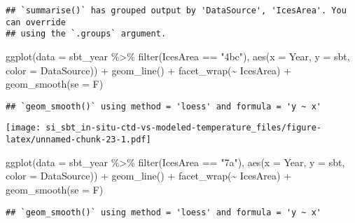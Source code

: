 \documentclass[
]{article}
\newenvironment{Shaded}{\begin{snugshade}}{\end{snugshade}}
\newcommand{\AttributeTok}[1]{\textcolor[rgb]{0.77,0.63,0.00}{#1}}
\newcommand{\FunctionTok}[1]{\textcolor[rgb]{0.00,0.00,0.00}{#1}}
\newcommand{\NormalTok}[1]{#1}
\newcommand{\SpecialCharTok}[1]{\textcolor[rgb]{0.00,0.00,0.00}{#1}}
\newcommand{\StringTok}[1]{\textcolor[rgb]{0.31,0.60,0.02}{#1}}
\begin{document}
\begin{verbatim}
## `summarise()` has grouped output by 'DataSource', 'IcesArea'. You can override
## using the `.groups` argument.
\end{verbatim}

\begin{Shaded}
\begin{Highlighting}[]
\FunctionTok{ggplot}\NormalTok{(}\AttributeTok{data =}\NormalTok{ sbt\_year }\SpecialCharTok{\%\textgreater{}\%} \FunctionTok{filter}\NormalTok{(IcesArea }\SpecialCharTok{==} \StringTok{"4bc"}\NormalTok{), }\FunctionTok{aes}\NormalTok{(}\AttributeTok{x =}\NormalTok{ Year, }\AttributeTok{y =}\NormalTok{ sbt, }\AttributeTok{color =}\NormalTok{ DataSource)) }\SpecialCharTok{+} \FunctionTok{geom\_line}\NormalTok{() }\SpecialCharTok{+} \FunctionTok{facet\_wrap}\NormalTok{(}\SpecialCharTok{\textasciitilde{}}\NormalTok{ IcesArea) }\SpecialCharTok{+} \FunctionTok{geom\_smooth}\NormalTok{(}\AttributeTok{se =}\NormalTok{ F)}
\end{Highlighting}
\end{Shaded}

\begin{verbatim}
## `geom_smooth()` using method = 'loess' and formula = 'y ~ x'
\end{verbatim}

\texttt{[image: si\_sbt\_in-situ-ctd-vs-modeled-temperature\_files/figure-latex/unnamed-chunk-23-1.pdf]}

\begin{Shaded}
\begin{Highlighting}[]
\FunctionTok{ggplot}\NormalTok{(}\AttributeTok{data =}\NormalTok{ sbt\_year }\SpecialCharTok{\%\textgreater{}\%} \FunctionTok{filter}\NormalTok{(IcesArea }\SpecialCharTok{==} \StringTok{"7a"}\NormalTok{), }\FunctionTok{aes}\NormalTok{(}\AttributeTok{x =}\NormalTok{ Year, }\AttributeTok{y =}\NormalTok{ sbt, }\AttributeTok{color =}\NormalTok{ DataSource)) }\SpecialCharTok{+} \FunctionTok{geom\_line}\NormalTok{() }\SpecialCharTok{+} \FunctionTok{facet\_wrap}\NormalTok{(}\SpecialCharTok{\textasciitilde{}}\NormalTok{ IcesArea) }\SpecialCharTok{+} \FunctionTok{geom\_smooth}\NormalTok{(}\AttributeTok{se =}\NormalTok{ F)}
\end{Highlighting}
\end{Shaded}

\begin{verbatim}
## `geom_smooth()` using method = 'loess' and formula = 'y ~ x'
\end{verbatim}
\end{document}
